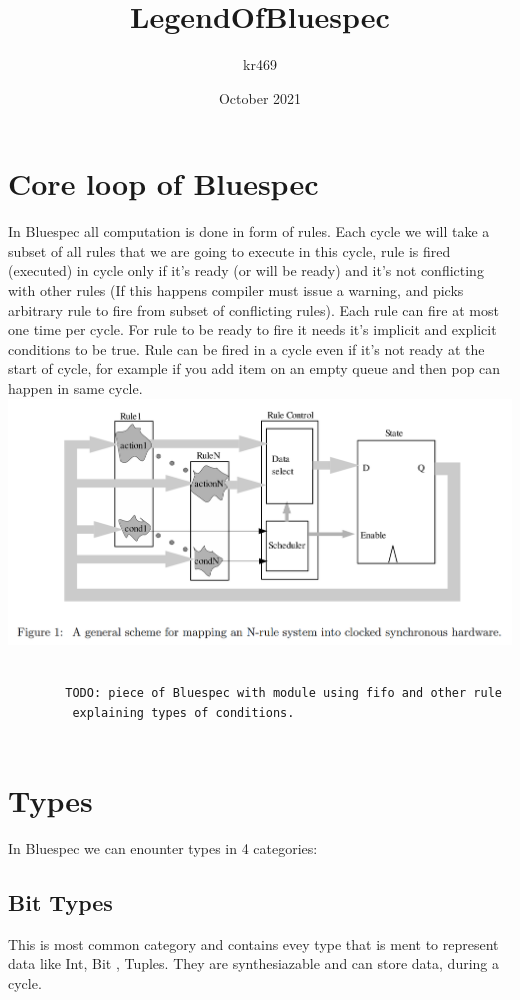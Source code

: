 \documentclass[14pt]{article}
\title{LegendOfBluespec}
\author{kr469 }
\date{October 2021}
\begin{document}
\maketitle

\section{Core loop of Bluespec}
    In Bluespec all computation is done in form of rules. Each cycle we will take a subset of all rules that we are going to execute in this cycle, rule is fired (executed) in cycle only if it's ready (or will be ready) and it's not conflicting with other rules (If this happens compiler must issue a warning, and picks arbitrary rule to fire from subset of conflicting rules). Each rule can fire at most one time per cycle. For rule to be ready to fire it needs it's implicit and explicit conditions to be true. Rule can be fired in a cycle even if it's not ready at the start of cycle, for example if you add item on an empty queue and then pop can happen in same cycle.\\
    \includegraphics[width=\textwidth]{Rulemapping.png}
    \begin{verbatim}
        
        TODO: piece of Bluespec with module using fifo and other rule
         explaining types of conditions.
        
    \end{verbatim}

\section{Types}
    In Bluespec we can enounter types in 4 categories:
    \subsection{Bit Types}
        This is most common category and contains evey type that is ment to represent data like Int, Bit , Tuples. They are synthesiazable and can store data, during a cycle.
\end{document}

